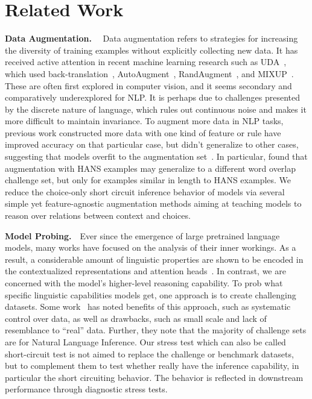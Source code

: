 \section{Related Work}


\textbf{Data Augmentation.}~~
Data augmentation refers to strategies for increasing the diversity 
of training examples without explicitly collecting new data. 
It has received active attention in recent machine learning research such as UDA~\cite{xie2020unsupervised}, 
which used back-translation~\cite{sennrich2016improving}, AutoAugment~\cite{cubuk2018autoaugment}, 
RandAugment~\cite{cubuk2020randaugment}, 
and MIXUP~\cite{zhang2017mixup}. These are often first explored in computer vision, 
and it seems secondary and 
comparatively underexplored for NLP. 
It is perhaps due to challenges presented by the discrete nature 
of language, which rules out continuous noise and makes it more difficult to maintain invariance.
To augment more data in NLP tasks, previous work constructed more data 
with one kind of feature or rule have improved 
accuracy on that particular case, but didn't generalize to 
other cases, suggesting that models overfit to the 
augmentation set~\cite{Iyyer2018,Liu2019a}. 
In particular, \citeauthor{mccoy2019right} found that 
augmentation with HANS examples may generalize 
to a different word overlap challenge set, 
but only for examples similar in length to HANS examples. 
We reduce the choice-only short circuit inference 
behavior of models via several simple yet feature-agnostic  
augmentation methods aiming at teaching models to reason over relations between context and choices. 

\textbf{Model Probing.}~~Ever since the emergence of large pretrained language models, 
many works have focused on the analysis of their inner workings. 
As a result, a considerable amount of linguistic properties are shown to be encoded 
in the contextualized representations and attention 
heads~\cite{goldberg2019,clark2019,liu-etal-2019-linguistic,tenny2019}. 
In contrast, we are concerned with the model's higher-level reasoning capability. 
To prob what specific linguistic capabilities models get, 
one approach is to create challenging datasets. 
Some work~\cite{belinkov2019analysis} has 
noted benefits of this approach,
such as systematic control over data, as well as
drawbacks, such as small scale and lack of resemblance
to ``real'' data. Further, they note that the
majority of challenge sets are for Natural Language
Inference. Our stress test which can also be called short-circuit test is not 
aimed to replace the 
challenge or benchmark datasets, but to complement
them to test whether really have the inference capability, 
in particular the short circuiting behavior. 
The behavior is reflected in downstream performance through diagnostic stress tests.

